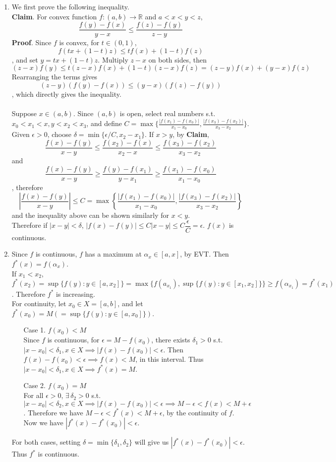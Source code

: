 \documentclass[11pt]{report}
\newcommand{\ra}{\rightarrow}
\newcommand{\abs}[1]{\left|#1\right|}
\newcommand{\imp}{\implies}
\newcommand{\R}{\mathbb{R}}
\begin{document}
\begin{enumerate}
\item We first prove the following inequality.\\
\textbf{Claim}. For convex function $f:(a, b)\ra \R$ and $a < x < y < z$, $$\frac{f(y) - f(x)}{y - x} \leq \frac{f(z) - f(y)}{z - y}$$
\textbf{Proof}. Since $f$ is convex, for $t\in (0, 1)$, $$f(tx +(1-t)z) \leq tf(x) + (1-t)f(z)$$, and set $y = tx + (1-t)z$. Multiply $z-x$ on both sides, then $$(z-x)f(y) \leq t(z-x)f(x) + (1-t)(z-x)f(z) = (z-y)f(x) + (y-x)f(z)$$
Rearranging the terms gives $$(z-y)(f(y)-f(x))\leq (y-x)(f(z)-f(y))$$
, which directly gives the inequality.\\
\\
Suppose $x\in (a, b)$. Since $(a, b)$ is open, select real numbers s.t. $x_0 < x_1 < x, y < x_2 < x_3$, and define $C = \max\{\frac{\abs{f(x_1) - f(x_0)}}{x_1-x_0}, \frac{\abs{f(x_3) - f(x_2)}}{x_3-x_2} \}$. Given $\epsilon > 0$, choose $\delta = \min\{\epsilon/C, x_2 - x_1\}$.
If $x > y$, by \textbf{Claim}, $$\frac{f(x) - f(y)}{x-y} \leq \frac{f(x_2) - f(x)}{x_2-x} \leq \frac{f(x_3) - f(x_2)}{x_3-x_2}$$
and
$$\frac{f(x) - f(y)}{x -y} \geq \frac{f(y) - f(x_1)}{y - x_1} \geq \frac{f(x_1) - f(x_0)}{x_1-x_0} $$, therefore $$\abs{\frac{f(x)-f(y)}{x - y}} \leq C = \max\left\{\frac{\abs{f(x_1) - f(x_0)}}{x_1-x_0}, \frac{\abs{f(x_3) - f(x_2)}}{x_3-x_2} \right\}$$
and the inequality above can be shown similarly for $x < y$.\\
Therefore if $\abs{x - y} <\delta$, $\abs{f(x) - f(y)} \leq C\abs{x - y} \leq C \dfrac{\epsilon}{C} =\epsilon$. $f(x)$ is continuous.

\item Since $f$ is continuous, $f$ has a maximum at $\alpha_x \in [a, x]$, by EVT. Then $f^*(x) = f(\alpha_x)$.\\
If $x_1 < x_2$, $f^*(x_2) = \sup \{f(y):y\in[a, x_2] \} = \max\{f(a_{x_1}), \sup\{f(y):y\in[x_1, x_2]\} \} \geq f(\alpha_{x_1}) = f^*(x_1)$. Therefore $f^*$ is increasing.\\
For continuity, let $x_0\in X = [a, b]$, and let $f^*(x_0) = M (=\sup\{f(y): y\in[a, x_0] \})$.
\begin{enumerate}
	\item[Case 1.]  $f(x_0) < M$\\
	Since $f$ is continuous, for $\epsilon = M - f(x_0)$, there exists $\delta_1 > 0$ s.t. $\abs{x - x_0} < \delta_1, x\in X \imp \abs{f(x) - f(x_0)} < \epsilon$. Then $f(x) - f(x_0) < \epsilon \imp f(x) < M$, in this interval. Thus $\abs{x - x_0} < \delta_1, x\in X \imp f^*(x) = M$.
	\item[Case 2.] $f(x_0) = M$\\
	For all $\epsilon > 0$, $\exists\,\delta_2 > 0$ s.t. $\abs{x - x_0} < \delta_2, x\in X \imp \abs{f(x) - f(x_0)} < \epsilon \imp M - \epsilon < f(x) < M + \epsilon$. Therefore we have $M - \epsilon < f^*(x) < M + \epsilon$, by the continuity of $f$. Now we have $\abs{f^*(x) - f^*(x_0)} < \epsilon$.
\end{enumerate}
For both cases, setting $\delta = \min\{\delta_1, \delta_2\}$ will give us $\abs{f^*(x) - f^*(x_0)} < \epsilon$. Thus $f^*$ is continuous.


\end{enumerate}
\end{document}
